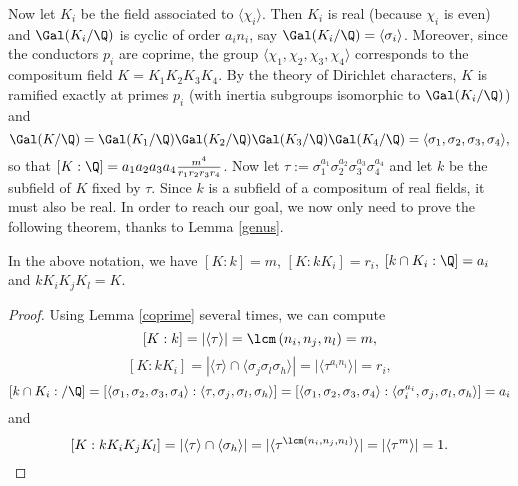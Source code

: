 Now let $K_i$ be the field associated to $\langle \chi_i\rangle$. Then $K_i$ is real (because $\chi_i$ is even) and $\Gal(K_i/\Q)$ is cyclic of order $a_in_i$, say $\Gal(K_i/\Q)=\langle \sigma_i\rangle$. Moreover, since the conductors $p_i$ are coprime, the group $\langle \chi_1,\chi_2,\chi_3,\chi_4\rangle$ corresponds to the compositum field $K=K_1K_2K_3K_4$. By the theory of Dirichlet characters, $K$ is ramified exactly at primes $p_i$ (with inertia subgroups isomorphic to $\Gal(K_i/\Q)$) and $$\Gal(K/\Q)=\Gal(K_1/\Q)\Gal(K_2/\Q)\Gal(K_3/\Q)\Gal(K_4/\Q)=\langle\sigma_1,\sigma_2,\sigma_3,\sigma_4\rangle,$$
so that $[K:\Q]=a_1a_2a_3a_4\frac{m^4}{r_1r_2r_3r_4}$. Now let $\tau:=\sigma_1^{a_1}\sigma_2^{a_2}\sigma_3^{a_3}\sigma_4^{a_4}$ and let $k$ be the subfield of $K$ fixed by $\tau$. Since $k$ is a subfield of a compositum of real fields, it must also be real. In order to reach our goal, we now only need to prove the following theorem, thanks to Lemma \ref{genus}. %

\begin{theorem}
In the above notation, we have $[K:k]=m$, $[K:kK_i]=r_i$, $[k\cap K_i:\Q]=a_i$ and $kK_iK_jK_l=K$.%
\end{theorem}
\begin{proof}
Using Lemma \ref{coprime} several times, we can compute
$$[K:k]=|\langle\tau\rangle|=\lcm\left(n_i,n_j,n_l\right)=m,$$
$$[K:kK_i]=|\langle\tau\rangle\cap \langle\sigma_j\sigma_l\sigma_h\rangle|=|\langle\tau^{a_in_i}\rangle|=r_i,$$
$$[k\cap K_i:/\Q]=[\langle\sigma_1,\sigma_2,\sigma_3,\sigma_4\rangle:\langle\tau,\sigma_j,\sigma_l,\sigma_h\rangle]=[\langle\sigma_1,\sigma_2,\sigma_3,\sigma_4\rangle:\langle\sigma_i^{a_i},\sigma_j,\sigma_l,\sigma_h\rangle]=a_i$$
and
$$[K:kK_iK_jK_l]=|\langle\tau\rangle\cap \langle\sigma_h\rangle|=|\langle\tau^{\lcm\left(n_i,n_j,n_l\right)}\rangle|=|\langle\tau^m\rangle|=1.$$
\end{proof}
\fi
